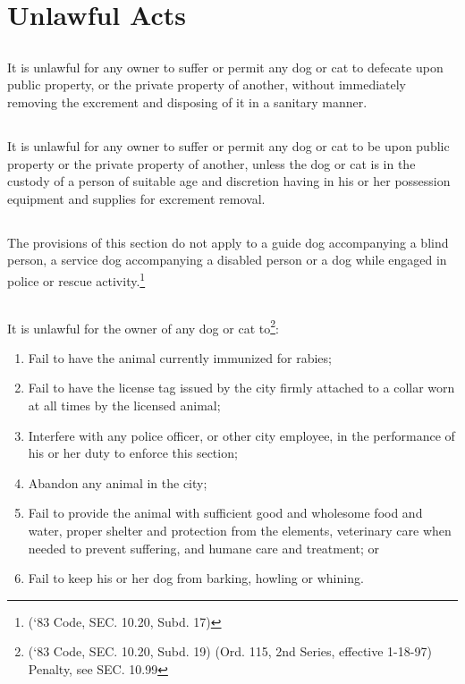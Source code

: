 \section{Unlawful Acts}
\subsection{}
It is unlawful for any owner to suffer or permit any dog or cat to defecate upon public property, or the private property of another, without immediately removing the excrement and disposing of it in a sanitary manner.
\subsection{}
It is unlawful for any owner to suffer or permit any dog or cat to be upon public property or the private property of another, unless the dog or cat is in the custody of a person of suitable age and discretion having in his or her possession equipment and supplies for excrement removal.
\subsection{}
The provisions of this section do not apply to a guide dog accompanying a blind person, a service dog accompanying a disabled person or a dog while engaged in police or rescue activity.\footnote{(‘83 Code, SEC. 10.20, Subd. 17)}
\subsection{}
It is unlawful for the owner of any dog or cat to\footnote{(‘83 Code, SEC. 10.20, Subd. 19)  (Ord. 115, 2nd Series, effective 1-18-97)  Penalty, see SEC. 10.99}:
\begin{enumerate}[{\indent}1)]
    \item Fail to have the animal currently immunized for rabies;
    \item Fail to have the license tag issued by the city firmly attached to a collar worn at all times by the licensed animal;
    \item Interfere with any police officer, or other city employee, in the performance of his or her duty to enforce this section;
    \item Abandon any animal in the city;
    \item Fail to provide the animal with sufficient good and wholesome food and water, proper shelter and protection from the elements, veterinary care when needed to prevent suffering, and humane care and treatment; or 
    \item Fail to keep his or her dog from barking, howling or whining.
\end{enumerate}

